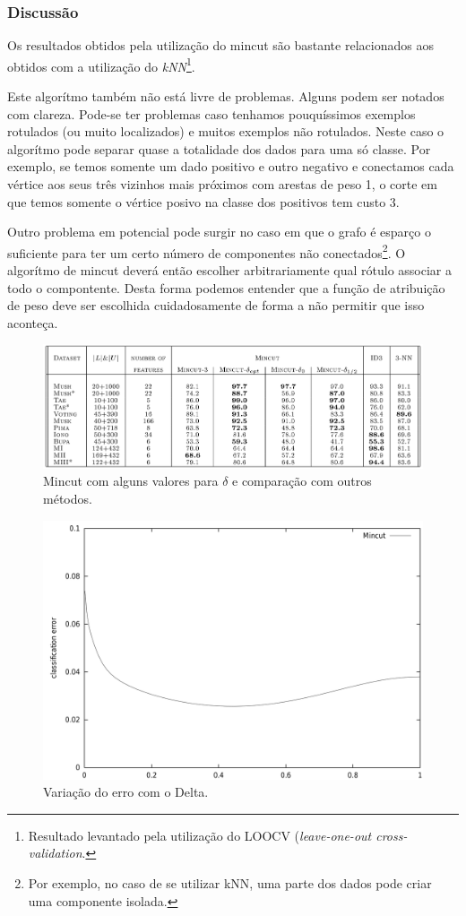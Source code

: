 \documentclass[12pt]{article}
\begin{document}
\subsubsection{Discussão}
Os resultados obtidos pela utilização do mincut são bastante relacionados aos obtidos com a utilização do \emph{kNN}\footnote{Resultado levantado pela utilização do LOOCV (\emph{leave-one-out cross-validation}.}.

Este algorítmo também não está livre de problemas. Alguns podem ser notados com clareza. Pode-se ter problemas caso tenhamos pouquíssimos exemplos rotulados (ou muito localizados) e muitos exemplos não rotulados. Neste caso o algorítmo pode separar quase a totalidade dos dados para uma só  classe. Por exemplo, se temos somente um dado positivo e outro negativo e conectamos cada vértice aos seus três vizinhos mais próximos com arestas de peso 1, o corte em que temos somente o vértice posivo na classe dos positivos tem custo 3.

Outro problema em potencial pode surgir no caso em que o grafo é esparço o suficiente para ter um certo número de componentes não conectados\footnote{Por exemplo, no caso de se utilizar kNN, uma parte dos dados pode criar uma componente isolada.}. O algorítmo de mincut deverá então escolher arbitrariamente qual rótulo associar a todo o compontente. Desta forma podemos entender que a função de atribuição de peso deve ser escolhida cuidadosamente de forma a não permitir que isso aconteça.

\begin{figure}[ht] \label{fig:hori}
        \begin{center}
                \includegraphics[width=1.0\textwidth]{mincut-comp}
        \end{center}
        \caption{Mincut com alguns valores para $\delta$ e comparação com outros métodos.}
\end{figure}

\begin{figure} \label{fig:delta}
        \begin{center}
                \includegraphics[width=.45\textwidth]{mincut-delta}
        \end{center}
        \caption{Variação do erro com o Delta.}
\end{figure}
\end{document}
